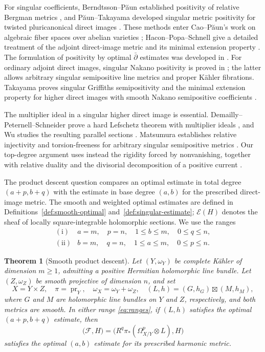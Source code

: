\documentclass[11pt,reqno]{amsart}
\numberwithin{equation}{section}
\newtheorem{theorem}{Theorem}[section]
\theoremstyle{definition}
\theoremstyle{remark}
\begin{document}
For singular coefficients, Berndtsson--P\u aun established positivity
of relative Bergman metrics \cite{BP08}, and P\u aun--Takayama
developed singular metric positivity for twisted pluricanonical
direct images \cite{PT18}.
These methods enter Cao--P\u aun's work on algebraic fiber spaces over
abelian varieties \cite{CP17}; Hacon--Popa--Schnell give a detailed
treatment of the adjoint direct-image metric and its minimal extension
property \cite{HPS18}.
The formulation of positivity by optimal $\bar\partial$ estimates
was developed in \cite{DNWZ23,WatCurv}.
For ordinary adjoint direct images, singular Nakano positivity is proved
in \cite{Wat25,IMW24}; the latter allows arbitrary singular
semipositive line metrics and proper K\"ahler fibrations.
Takayama proves singular Griffiths semipositivity and the minimal
extension property for higher direct images with smooth Nakano
semipositive coefficients \cite{Tak24}.

The multiplier ideal in a singular higher direct image is essential.
Demailly--Peternell--Schneider prove a hard Lefschetz theorem with
multiplier ideals \cite{DPS01}, and Wu studies the resulting
parallel sections \cite{Wu21}.
Matsumura establishes relative injectivity and torsion-freeness for
arbitrary singular semipositive metrics \cite{Mat22}.
Our top-degree argument uses instead the rigidity forced by
nonvanishing, together with relative duality and the divisorial
decomposition of a positive current \cite{RRV71,Siu74}.

The product descent question compares an optimal estimate in total
degree $(a+p,b+q)$ with the estimate in base degree $(a,b)$ for the
prescribed direct-image metric.  The smooth and weighted optimal
estimates are defined in Definitions~\ref{def:smooth-optimal}
and~\ref{def:singular-estimate}; $\mathscr E(H)$ denotes the sheaf of
locally square-integrable holomorphic sections.  We use the ranges
\begin{equation}\label{eq:ranges}
\begin{array}{ll}
\mathrm{(i)}&a=m,\quad p=n,\quad 1\le b\le m,\quad0\le q\le n,\\
\mathrm{(ii)}&b=m,\quad q=n,\quad 1\le a\le m,\quad0\le p\le n.
\end{array}
\end{equation}

\begin{theorem}[Smooth product descent]\label{thm:product-descent}
Let $(Y,\omega_Y)$ be complete K\"ahler of dimension $m\ge1$, admitting
a positive Hermitian holomorphic line bundle.  Let $(Z,\omega_Z)$
be smooth projective of dimension $n$, and set
\[
 X=Y\times Z,\quad\pi=\operatorname{pr}_Y,\quad
 \omega_X=\omega_Y+\omega_Z,\quad
 (L,h)=(G,h_G)\boxtimes(M,h_M),
\]
where $G$ and $M$ are holomorphic line bundles on $Y$ and $Z$,
respectively, and both metrics are smooth.  In either range \eqref{eq:ranges}, if $(L,h)$
satisfies the optimal $(a+p,b+q)$ estimate, then
\[
 \bigl(\mathcal F,H\bigr)
 =\bigl(R^q\pi_*(\Omega_{X/Y}^p\otimes L),H\bigr)
\]
satisfies the optimal $(a,b)$ estimate for its prescribed harmonic
metric.
\end{theorem}
\end{document}
